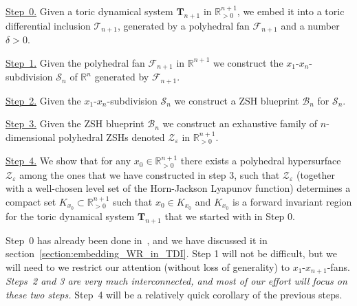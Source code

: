 \documentclass[12pt,letterpaper]{article}
\renewcommand{\S}{\mathcal{S}}
\newcommand{\T}{\mathcal{T}}
\newcommand{\B}{\mathcal{B}}
\newcommand{\F}{\mathcal{F}}
\newcommand{\Z}{\mathcal{Z}}
\newcommand{\RR}{\mathbb{R}}
\newcommand{\RRn}{\mathbb{R}^n}
\newcommand{\RRp}{\mathbb{R}_{>0}}
\newcommand{\eps}{\varepsilon}
\begin{document}
\medskip

{\em 

\underline{Step~0.} Given a toric dynamical system $\mathbf{T}_{n+1}$ in $\RR^{n+1}_{>0}$, we embed it into a toric differential inclusion $\T_{n+1}$, generated by a polyhedral fan $\F_{n+1}$ and a number $\delta>0$.

\smallskip

\underline{Step~1.} Given the polyhedral fan $\F_{n+1}$ in $\RR^{n+1}$ we construct the {$x_1$-$x_n$-subdivision} $\S_n$ of $\RRn$ generated by $\F_{n+1}$.

\smallskip

\underline{Step~2.} Given the $x_1$-$x_n$-subdivision $\S_n$ we construct a {ZSH blueprint} $\B_n$ for $\S_n$. 

\smallskip

\underline{Step~3.} Given the ZSH blueprint $\B_n$ we construct an exhaustive family of $n$-dimensional polyhedral ZSHs denoted $\Z_{\eps}$ in $\RRp^{n+1}$.

\smallskip

\underline{Step~4.} We show that for any $x_0 \in \RRp^{n+1}$ there exists a polyhedral hypersurface $\Z_{\eps}$ among the ones that we have constructed in step 3, such that $\Z_{\eps}$ (together with a well-chosen level set of the Horn-Jackson Lyapunov function) determines a compact set $K_{x_0} \subset \RRp^{n+1}$ such that $x_0 \in K_{x_0}$ and $K_{x_0}$  is a forward invariant region for the toric dynamical system $\mathbf{T}_{n+1}$ that we started with in Step 0.

}

\medskip


Step~0 has already been done in~\cite{Craciun_SIAGA_2019}, and we have discussed it in section~\ref{section:embedding_WR_in_TDI}. Step 1 will not be difficult, but we will need to we restrict our attention (without loss of generality) to $x_1$-$x_{n+1}$-fans.
{\em Steps~2 and 3 are very much interconnected, and most of our effort will focus on these two steps.} Step~4 will be a relatively quick corollary of the previous steps. 
\end{document}
